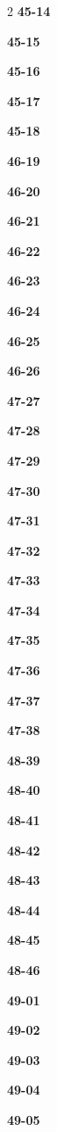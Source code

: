 \documentclass[10pt,a4paper]{article}
\begin{document}
\begin{multicols}{2}
\noindent\textbf{45-14}\ \par
\noindent\textbf{45-15}\ \par
\noindent\textbf{45-16}\ \par
\noindent\textbf{45-17}\ \par
\noindent\textbf{45-18}\ \par
\noindent\textbf{46-19}\ \par
\noindent\textbf{46-20}\ \par
\noindent\textbf{46-21}\ \par
\noindent\textbf{46-22}\ \par
\noindent\textbf{46-23}\ \par
\noindent\textbf{46-24}\ \par
\noindent\textbf{46-25}\ \par
\noindent\textbf{46-26}\ \par
\noindent\textbf{47-27}\ \par
\noindent\textbf{47-28}\ \par
\noindent\textbf{47-29}\ \par
\noindent\textbf{47-30}\ \par
\noindent\textbf{47-31}\ \par
\noindent\textbf{47-32}\ \par
\noindent\textbf{47-33}\ \par
\noindent\textbf{47-34}\ \par
\noindent\textbf{47-35}\ \par
\noindent\textbf{47-36}\ \par
\noindent\textbf{47-37}\ \par
\noindent\textbf{47-38}\ \par
\noindent\textbf{48-39}\ \par
\noindent\textbf{48-40}\ \par
\noindent\textbf{48-41}\ \par
\noindent\textbf{48-42}\ \par
\noindent\textbf{48-43}\ \par
\noindent\textbf{48-44}\ \par
\noindent\textbf{48-45}\ \par
\noindent\textbf{48-46}\ \par
\noindent\textbf{49-01}\ \par
\noindent\textbf{49-02}\ \par
\noindent\textbf{49-03}\ \par
\noindent\textbf{49-04}\ \par
\noindent\textbf{49-05}\ \par

\end{multicols}
\end{document}
